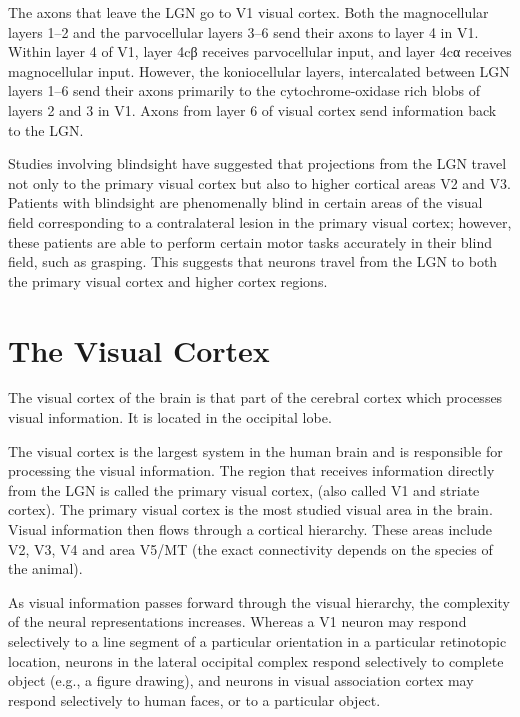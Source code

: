 \documentclass[]{book}
\begin{document}
The axons that leave the LGN go to V1 visual cortex. Both the magnocellular layers 1--2 and the parvocellular layers 3--6 send their axons to layer 4 in V1. Within layer 4 of V1, layer 4cβ receives parvocellular input, and layer 4cα receives magnocellular input. However, the koniocellular layers, intercalated between LGN layers 1--6 send their axons primarily to the cytochrome-oxidase rich blobs of layers 2 and 3 in V1. Axons from layer 6 of visual cortex send information back to the LGN.

Studies involving blindsight have suggested that projections from the LGN travel not only to the primary visual cortex but also to higher cortical areas V2 and V3. Patients with blindsight are phenomenally blind in certain areas of the visual field corresponding to a contralateral lesion in the primary visual cortex; however, these patients are able to perform certain motor tasks accurately in their blind field, such as grasping. This suggests that neurons travel from the LGN to both the primary visual cortex and higher cortex regions.

\hypertarget{the-visual-cortex}{%
\section{The Visual Cortex}\label{the-visual-cortex}}

The visual cortex of the brain is that part of the cerebral cortex which processes visual information. It is located in the occipital lobe.

The visual cortex is the largest system in the human brain and is responsible for processing the visual information. The region that receives information directly from the LGN is called the primary visual cortex, (also called V1 and striate cortex). The primary visual cortex is the most studied visual area in the brain. Visual information then flows through a cortical hierarchy. These areas include V2, V3, V4 and area V5/MT (the exact connectivity depends on the species of the animal).

As visual information passes forward through the visual hierarchy, the complexity of the neural representations increases. Whereas a V1 neuron may respond selectively to a line segment of a particular orientation in a particular retinotopic location, neurons in the lateral occipital complex respond selectively to complete object (e.g., a figure drawing), and neurons in visual association cortex may respond selectively to human faces, or to a particular object.
\end{document}
